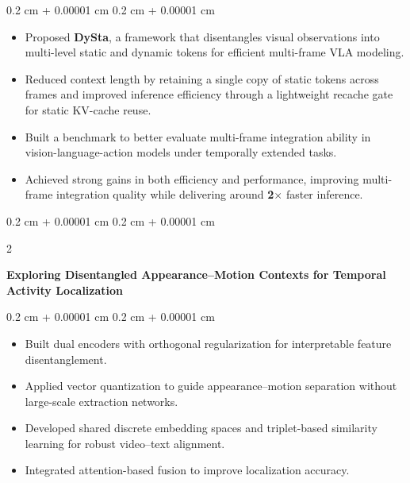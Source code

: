 \documentclass[10pt, letterpaper]{article}
\newenvironment{highlights}{
    \begin{itemize}[
        topsep=0.10 cm,
        parsep=0.10 cm,
        partopsep=0pt,
        itemsep=0pt,
        leftmargin=0.4 cm + 10pt
    ]
}{
    \end{itemize}
} %
\newenvironment{onecolentry}{
    \begin{adjustwidth}{
        0.2 cm + 0.00001 cm
    }{
        0.2 cm + 0.00001 cm
    }
}{
    \end{adjustwidth}
} %
\newenvironment{twocolentry}[2][]{
    \onecolentry
    \def\secondColumn{#2}
    \setcolumnwidth{\fill, 4.5 cm}
    \begin{paracol}{2}
}{
    \switchcolumn \raggedleft \secondColumn
    \end{paracol}
    \endonecolentry
} %
\begin{document}
\vspace{0.10 cm}
\begin{onecolentry}
    \begin{highlights}
        \item Proposed \textbf{DySta}, a framework that disentangles visual observations into multi-level static and dynamic tokens for efficient multi-frame VLA modeling.
        \item Reduced context length by retaining a single copy of static tokens across frames and improved inference efficiency through a lightweight recache gate for static KV-cache reuse.
        \item Built a benchmark to better evaluate multi-frame integration ability in vision-language-action models under temporally extended tasks.
        \item Achieved strong gains in both efficiency and performance, improving multi-frame integration quality while delivering around \textbf{2$\times$} faster inference.
    \end{highlights}
\end{onecolentry}

\vspace{0.2 cm}

\begin{twocolentry}{}
    \begin{minipage}[t]{\textwidth}
        \justifying
        \textbf{Exploring Disentangled Appearance–Motion Contexts for Temporal Activity Localization}
    \end{minipage}
\end{twocolentry}

\vspace{0.10 cm}
\begin{onecolentry}
    \begin{highlights}
        \item Built dual encoders with orthogonal regularization for interpretable feature disentanglement.
        \item Applied vector quantization to guide appearance–motion separation without large-scale extraction networks.
        \item Developed shared discrete embedding spaces and triplet-based similarity learning for robust video–text alignment.
        \item Integrated attention-based fusion to improve localization accuracy.
    \end{highlights}
\end{onecolentry}
\end{document}
